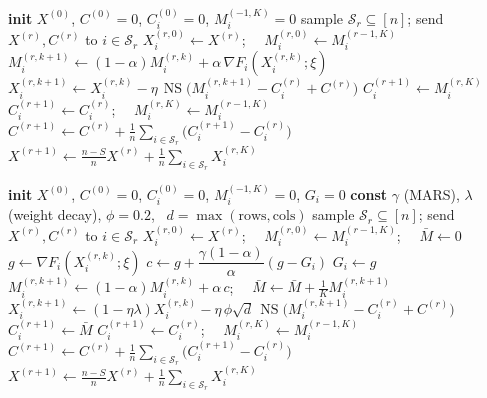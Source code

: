 \documentclass[11pt]{article}
\newcommand{\NS}{\operatorname{NS}}
\newcommand{\lmo}{\operatorname{lmo}}
\newcommand{\gF}{\nabla F_i}
\begin{document}
\begin{algorithm}[H]
\caption{FedMuon \cite{fedmuon}}
\begin{algorithmic}[1]
\State \textbf{init} $X^{(0)}$, $C^{(0)}\!=\!0$, $C_i^{(0)}\!=\!0$, $M_i^{(-1,K)}\!=\!0$
  \State sample $\mathcal{S}_r\subseteq[n]$; send $X^{(r)},C^{(r)}$ to $i\in\mathcal{S}_r$
    \State $X_i^{(r,0)}\gets X^{(r)}$; \ \ $M_i^{(r,0)}\gets M_i^{(r-1,K)}$
      \State $M_i^{(r,k+1)}\gets(1-\alpha)M_i^{(r,k)}+\alpha\,\gF(X_i^{(r,k)};\xi)$
      \State $X_i^{(r,k+1)}\gets X_i^{(r,k)}-\eta\,\NS\big(M_i^{(r,k+1)}-C_i^{(r)}+C^{(r)}\big)$
        \Comment{$=X_i^{(r,k)}+\eta\,\lmo(\cdot)$}
    \EndFor
    \State $C_i^{(r+1)}\gets M_i^{(r,K)}$
  \EndFor
    \State $C_i^{(r+1)}\gets C_i^{(r)}$; \ \ $M_i^{(r,K)}\gets M_i^{(r-1,K)}$
  \EndFor
  \State $C^{(r+1)}\gets C^{(r)}+\tfrac1n\sum_{i\in\mathcal{S}_r}\big(C_i^{(r+1)}-C_i^{(r)}\big)$
  \State $X^{(r+1)}\gets\tfrac{n-S}{n}X^{(r)}+\tfrac1n\sum_{i\in\mathcal{S}_r}X_i^{(r,K)}$
\EndFor
\end{algorithmic}
\end{algorithm}

\begin{algorithm}[H]
\caption{FedMARS-M: FedMuon $+$ MARS-M variance reduction \cite{marsm} $+$ Moonlight scaling \cite{moonlight} $+$ mean control variate}
\begin{algorithmic}[1]
\State \textbf{init} $X^{(0)}$, $C^{(0)}\!=\!0$, $C_i^{(0)}\!=\!0$, $M_i^{(-1,K)}\!=\!0$, $G_i\!=\!0$
\State \textbf{const} $\gamma$ (MARS), $\lambda$ (weight decay), $\phi=0.2$, \ $d=\max(\text{rows},\text{cols})$
  \State sample $\mathcal{S}_r\subseteq[n]$; send $X^{(r)},C^{(r)}$ to $i\in\mathcal{S}_r$
    \State $X_i^{(r,0)}\gets X^{(r)}$; \ \ $M_i^{(r,0)}\gets M_i^{(r-1,K)}$; \ \ $\bar M\gets 0$
      \State $g\gets\gF(X_i^{(r,k)};\xi)$
      \State $c\gets g+\dfrac{\gamma(1-\alpha)}{\alpha}(g-G_i)$
      \State $G_i\gets g$
      \State $M_i^{(r,k+1)}\gets(1-\alpha)M_i^{(r,k)}+\alpha\,c$; \ \ $\bar M\gets\bar M+\tfrac1K M_i^{(r,k+1)}$
      \State $X_i^{(r,k+1)}\gets(1-\eta\lambda)X_i^{(r,k)}-\eta\,\phi\sqrt{d}\,\NS\big(M_i^{(r,k+1)}-C_i^{(r)}+C^{(r)}\big)$
    \EndFor
    \State $C_i^{(r+1)}\gets\bar M$
  \EndFor
    \State $C_i^{(r+1)}\gets C_i^{(r)}$; \ \ $M_i^{(r,K)}\gets M_i^{(r-1,K)}$
  \EndFor
  \State $C^{(r+1)}\gets C^{(r)}+\tfrac1n\sum_{i\in\mathcal{S}_r}\big(C_i^{(r+1)}-C_i^{(r)}\big)$
  \State $X^{(r+1)}\gets\tfrac{n-S}{n}X^{(r)}+\tfrac1n\sum_{i\in\mathcal{S}_r}X_i^{(r,K)}$
\EndFor
\end{algorithmic}
\end{algorithm}
\end{document}
